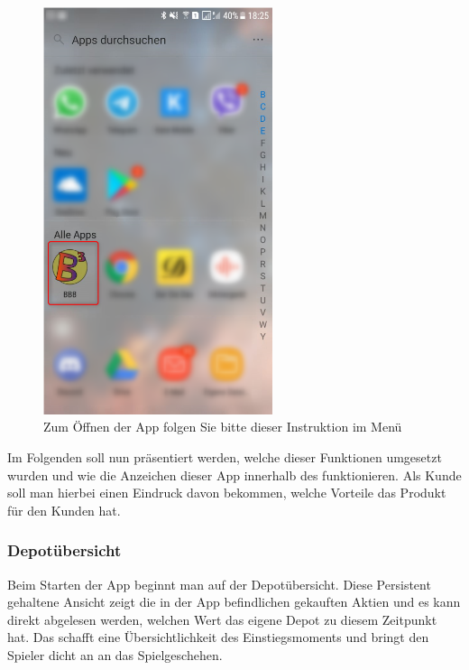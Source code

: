 \documentclass[10pt]{scrartcl}
\begin{document}
\begin{figure}[H]
	\centering
	\includegraphics[width=0.6\textwidth]{Bilder/Prsi/StartenDerApp.png}
	\caption{Zum Öffnen der App folgen Sie bitte dieser Instruktion im Menü}
\end{figure}

Im Folgenden soll nun präsentiert werden, welche dieser Funktionen umgesetzt wurden und wie die Anzeichen dieser App innerhalb des funktionieren. Als Kunde soll man hierbei einen Eindruck davon bekommen, welche Vorteile das Produkt für den Kunden hat. 

\subsubsection{Depotübersicht}
Beim Starten der App beginnt man auf der Depotübersicht. Diese Persistent gehaltene Ansicht zeigt die in der App befindlichen gekauften Aktien und es kann direkt abgelesen werden, welchen Wert das eigene Depot zu diesem Zeitpunkt hat. Das schafft eine Übersichtlichkeit des Einstiegsmoments und bringt den Spieler dicht an an das Spielgeschehen.
\end{document}
